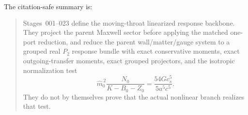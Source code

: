 The citation-safe summary is:
\begin{quote}
Stages~001--023 define the moving-throat linearized response backbone.  They project the parent Maxwell sector before applying the matched one-port reduction, and reduce the parent wall/matter/gauge system to a grouped real \(P_2\) response bundle with exact conservative moments, exact outgoing-transfer moments, exact grouped projectors, and the isotropic normalization test
\[
\widehat m_0^{\,2}\frac{N_0}{K-B_0-Z_0}=\frac{54Gc_s^5}{5a^5c^5}.
\]
They do not by themselves prove that the actual nonlinear branch realizes that test.
\end{quote}
